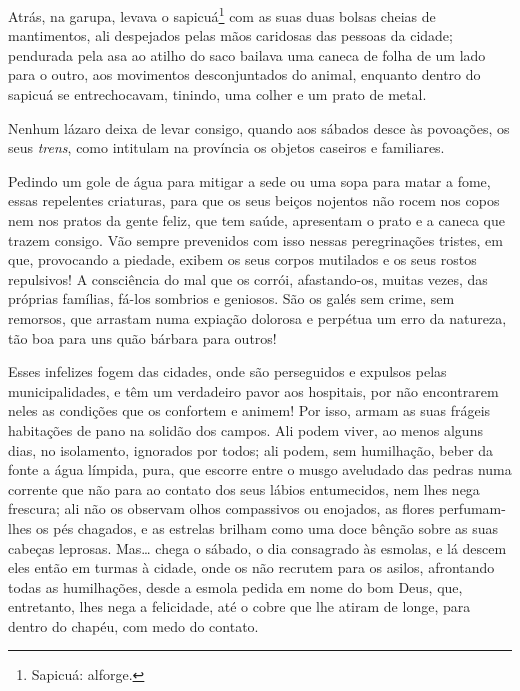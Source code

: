 {

Atrás, na garupa, levava o sapicuá\footnote{Sapicuá: alforge.}
com as suas duas bolsas cheias de mantimentos, ali despejados
pelas mãos caridosas das pessoas da cidade; pendurada pela asa ao atilho
do saco bailava uma caneca de folha de um lado para o outro,
aos movimentos desconjuntados do animal, enquanto dentro do sapicuá se
entrechocavam, tinindo, uma colher e um prato de metal.

Nenhum lázaro deixa de levar consigo, quando aos
sábados desce às povoações, os seus \emph{trens}, como intitulam
na província os objetos caseiros e familiares.

Pedindo um gole de água para mitigar a sede ou
uma sopa para matar a fome, essas repelentes criaturas, para
que os seus beiços nojentos não rocem nos copos nem nos pratos da gente
feliz, que tem saúde, apresentam o prato e a caneca que trazem consigo.
Vão sempre prevenidos com isso nessas peregrinações tristes, em
que, provocando a piedade, exibem os seus corpos mutilados e os seus
rostos repulsivos! A consciência do mal que os
corrói, afastando-os, muitas vezes, das próprias
famílias, fá-los sombrios e geniosos. São os galés sem crime,
sem remorsos, que arrastam numa expiação dolorosa e perpétua um erro da
natureza, tão boa para uns quão bárbara para outros!

Esses infelizes fogem das cidades, onde são perseguidos e
expulsos pelas municipalidades, e têm um verdadeiro pavor aos
hospitais, por não encontrarem neles as condições que os confortem e
animem! Por isso, armam as suas frágeis habitações de pano na solidão
dos campos. Ali podem viver, ao menos alguns dias, no isolamento,
ignorados por todos; ali podem, sem humilhação, beber da fonte
a água límpida, pura, que escorre entre o musgo aveludado das pedras
numa corrente que não para ao contato dos seus lábios
entumecidos, nem lhes nega frescura; ali não os observam olhos
compassivos ou enojados, as flores perfumam-lhes os pés
chagados, e as estrelas brilham como uma doce bênção sobre as
suas cabeças leprosas. Mas\ldots{} chega o sábado, o dia
consagrado às esmolas, e lá descem eles então em turmas
à cidade, onde os não recrutem para os asilos, afrontando todas
as humilhações, desde a esmola pedida em nome do bom Deus, que,
entretanto, lhes nega a felicidade, até o cobre que lhe atiram de longe,
para dentro do chapéu, com medo do contato.

}
